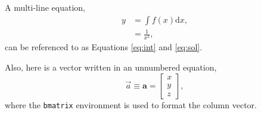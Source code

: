 A multi-line equation,
%
\begin{align}
  y &= \int f(x) \mathrm{d} x,\label{eq:int}\\
  &= \frac{1}{x^2},\label{eq:sol}
\end{align}
%
can be referenced to as Equations \ref{eq:int} and \ref{eq:sol}.

Also, here is a vector written in an unnumbered equation,
%
\begin{equation*}
  \vec{a} \equiv \bm{a} = 
  \begin{bmatrix}
    x\\y\\z
  \end{bmatrix}
  ,
\end{equation*}
%
where the \texttt{bmatrix} environment is used to format the column vector.

